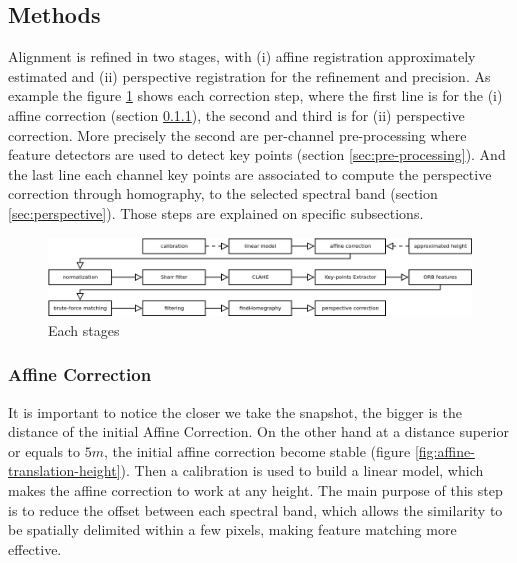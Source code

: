 \documentclass[]{elsarticle}
\begin{document}
	\subsection{Methods}
	
	Alignment is refined in two stages, with (i) affine registration approximately estimated
	and (ii) perspective registration for the refinement and precision.
	As example the figure \ref{fig:each-stages} shows each correction step, where the first line is for the (i) affine correction (section \ref{sec:affine}), the second and third is for (ii) perspective correction.
	More precisely the second are per-channel pre-processing where feature detectors are used to detect key points (section \ref{sec:pre-processing}).
	And the last line each channel key points are associated to compute the perspective correction through homography, to the selected spectral band (section \ref{sec:perspective}).
	Those steps are explained on specific subsections.
	
	\begin{figure}[H]
		\centering
		\includegraphics[width=\linewidth]{../figures/step.png}
		\caption{Each stages}
		\label{fig:each-stages}
	\end{figure}

	
	\subsubsection{Affine Correction}
	\label{sec:affine}
	
	It is important to notice the closer we take the snapshot, the bigger is the distance of the initial Affine Correction.
	On the other hand at a distance superior or equals to $5m$, the initial affine correction become stable (figure \ref{fig:affine-translation-height}).
	Then a calibration is used to build a linear model, which makes the affine correction to work at any height.
	The main purpose of this step is to reduce the offset between each spectral band,
	which allows the similarity to be spatially delimited within a few pixels, making feature matching more effective.
	
\end{document}
